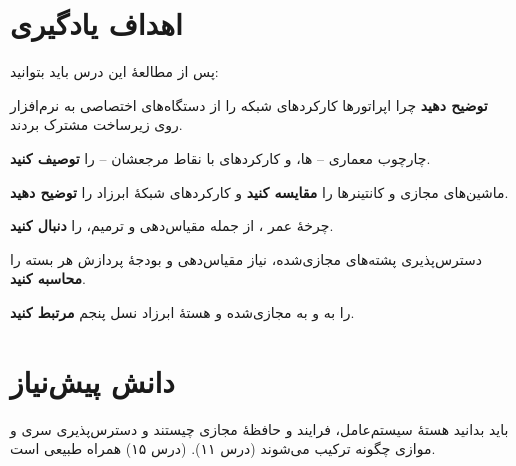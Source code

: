 \documentclass[11pt,a4paper]{article}
\begin{document}
\ACNcover

\section{اهداف یادگیری}
پس از مطالعهٔ این درس باید بتوانید:
\begin{objectives}
  \item \textbf{توضیح دهید} چرا اپراتورها کارکردهای شبکه را از دستگاه‌های اختصاصی به نرم‌افزار روی زیرساخت مشترک بردند.
  \item چارچوب معماری  -- ها،  و کارکردهای  با نقاط مرجعشان -- را \textbf{توصیف کنید}.
  \item ماشین‌های مجازی و کانتینرها را \textbf{مقایسه کنید} و کارکردهای شبکهٔ ابرزاد را \textbf{توضیح دهید}.
  \item چرخهٔ عمر ، از جمله مقیاس‌دهی و ترمیم، را \textbf{دنبال کنید}.
  \item دسترس‌پذیری پشته‌های مجازی‌شده، نیاز مقیاس‌دهی و بودجهٔ پردازش هر بسته را \textbf{محاسبه کنید}.
  \item {} را به  و به  مجازی‌شده و هستهٔ ابرزاد نسل پنجم \textbf{مرتبط کنید}.
\end{objectives}

\section{دانش پیش‌نیاز}
باید بدانید هستهٔ سیستم‌عامل، فرایند و حافظهٔ مجازی چیستند و دسترس‌پذیری سری و موازی چگونه ترکیب می‌شوند (درس ۱۱).
 (درس ۱۵) همراه طبیعی  است.
\end{document}
